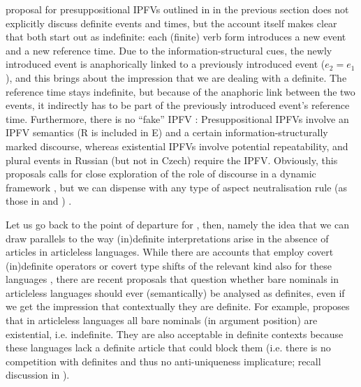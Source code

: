 \documentclass[output=paper,colorlinks,citecolor=brown]{langscibook}
\begin{document}
 proposal for presuppositional IPFVs outlined in  in the previous section does not explicitly discuss definite events and times, but the account itself makes clear that both start out as indefinite: each (finite) verb form introduces a new event and a new reference time. Due to the information-structural cues, the newly introduced event is anaphorically linked to a previously introduced event ($e_2 = e_1$), and this brings about the impression that we are dealing with a definite. The reference time stays indefinite, but because of the anaphoric link between the two events, it indirectly has to be part of the previously introduced event's reference time. Furthermore, there is no ``fake'' IPFV \citep[][]{gehrke22,gehrketrueipf}: Presuppositional IPFVs involve an IPFV semantics (R is included in E) and a certain information-structurally marked discourse, whereas  existential IPFVs involve potential repeatability, and plural events in Russian (but not in Czech) require the IPFV. Obviously, this proposals calls for close exploration of the role of discourse in a dynamic framework \citep[see also][]{Altshuler2012}, but we can dispense with any type of aspect neutralisation rule (as those in  and )%
.

Let us go back to the point of departure for \citet{gronnstechow16}, then, namely the idea that we can draw parallels to the way (in)definite interpretations arise in the absence of articles in articleless languages. While there are accounts that employ covert (in)definite operators or covert type shifts of the relevant kind also for these languages \citep[e.g.][]{chierchia98}, there are recent proposals that question whether bare nominals in articleless languages should ever (semantically) be analysed as definites, even if we get the impression that contextually they are definite. For example, \citet{heim11} proposes that in articleless languages all bare nominals (in argument position) are existential, i.e. indefinite. They are also acceptable in definite contexts because these languages lack a definite article that could block them (i.e. there is no competition with definites and thus no anti-uniqueness implicature; recall discussion in ). 
\end{document}
